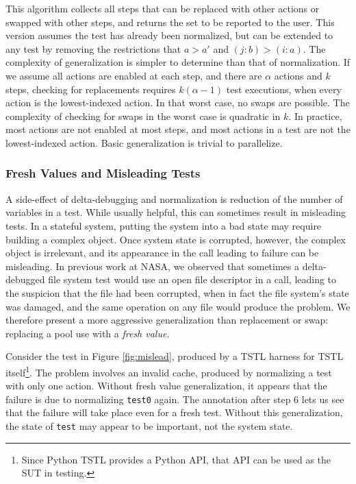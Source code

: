 This algorithm collects all steps that can be replaced with other
actions or swapped with other steps, and returns the set to be
reported to the user.  This version assumes the test has already been
normalized, but can be extended to any test by removing the
restrictions that $a > a'$ and $(j : b) > (i : a)$.  The complexity of
generalization is simpler to determine than that of normalization.  If
we assume all actions are enabled at each step, and there are $\alpha$
actions and $k$ steps, checking for replacements requires $k (\alpha-1)$
test executions, when every action is the lowest-indexed action.
In that worst case, no swaps are possible.  The complexity of checking
for swaps in the worst case is quadratic in $k$.  In practice, most
actions are not enabled at most steps, and most actions in a test
are not the lowest-indexed action.  Basic generalization is trivial to
parallelize.


\subsubsection{Fresh Values and Misleading Tests}
\label{freshgen}

A side-effect of delta-debugging and normalization is reduction of the
number of variables in a test.  While usually helpful, this can
sometimes result in misleading tests.  In a stateful system,
putting the system into a bad state may require building a complex
object.  Once system state is corrupted, however, the complex object
is irrelevant, and its appearance in the call leading to failure can
be misleading.  In previous work at NASA, we observed that sometimes a
delta-debugged file system test \cite{ICSEDiff,AMAI} would use an
open file descriptor in a call, leading to the suspicion that the file
had been corrupted, when in fact the file system's state was damaged,
and the same operation on any file would produce the problem.  We
therefore present a more aggressive generalization than replacement or
swap: replacing a pool use with a \emph{fresh value}.

Consider the test in Figure \ref{fig:mislead}, produced by a
TSTL harness for  TSTL itself\footnote{Since Python TSTL
  provides a Python API, that API can be used as the SUT in testing.}.  The
problem involves an invalid cache, produced by normalizing a test with
only one action.  Without fresh value generalization, it appears that
the failure is due to normalizing {\tt test0} again.
The annotation after step 6 lets us see that the failure
will take place even for a fresh test.
Without this generalization, the state of {\tt test} may
appear to be important, not the system state.

